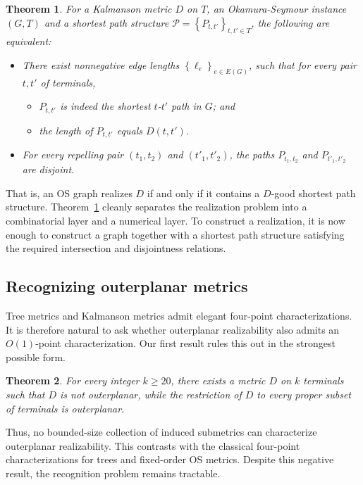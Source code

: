 \documentclass[11pt]{article}
\newtheorem{theorem}{Theorem}
\newcommand{\pset}{{\mathcal{P}}}
\newcommand{\set}[1]{\left\{ #1 \right\}}
\begin{document}
\begin{theorem}
\label{lem: 2-path condition}
For a Kalmanson metric $D$ on $T$, an Okamura-Seymour instance $(G,T)$ and a shortest path structure $\pset=\set{P_{t,t'}}_{t,t'\in T}$, the following are equivalent:
\begin{itemize}
    \item There exist nonnegative edge lengths $\set{\ell_e}_{e\in E(G)}$, such that
    for every pair $t,t'$ of terminals,
    \label{prop_2}
    \begin{itemize}
        \item $P_{t,t'}$ is indeed the shortest $t$-$t'$ path in $G$; and
        \item the length of $P_{t,t'}$ equals $D(t,t')$.
    \end{itemize}
    \item For every repelling pair $(t_1,t_2)$ and $(t'_1,t'_2)$, the paths $P_{t_1,t_2}$ and $P_{t'_1,t'_2}$ are disjoint.
\end{itemize}
\end{theorem}

That is, an OS graph realizes $D$ if and only if it contains a $D$-good
shortest path structure.  Theorem~\ref{lem: 2-path condition} cleanly separates the
realization problem into a combinatorial layer and a numerical layer.  To
construct a realization, it is now enough to construct a graph together with a
shortest path structure satisfying the required intersection and disjointness
relations.

\subsection{Recognizing outerplanar metrics}\label{subsec:intro-outerplanar}

Tree metrics and Kalmanson metrics admit elegant four-point characterizations. It is therefore natural to ask whether outerplanar realizability also admits an $O(1)$-point characterization. Our first result rules this out in the strongest possible form.

\begin{theorem}\label{thm: no O(1) point}
For every integer $k\ge 20$, there exists a metric $D$ on $k$ terminals such that $D$ is not outerplanar, while the restriction of $D$ to every proper subset of terminals is outerplanar.
\end{theorem}

Thus, no bounded-size collection of induced submetrics can characterize outerplanar realizability. This contrasts with the classical four-point characterizations for trees and fixed-order OS metrics. Despite this negative result, the recognition problem remains tractable.
\end{document}
